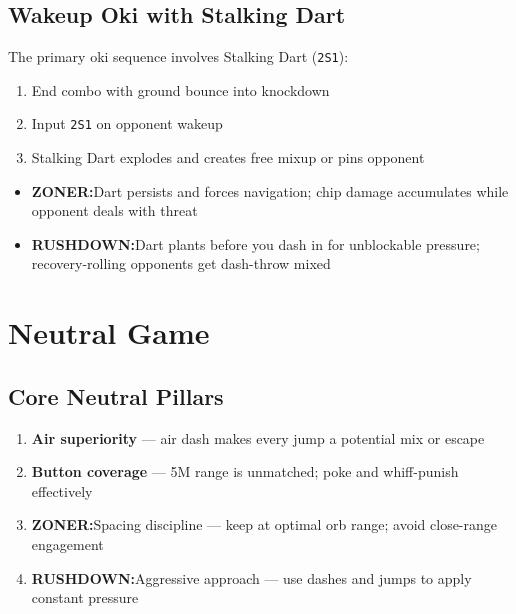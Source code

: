 \documentclass[12pt, a4paper]{report}
\newcommand{\notation}[1]{{\small\texttt{\textcolor{ahriCyan}{#1}}}}
\newcommand{\zoner}{\textcolor{ahriCyan}{\bfseries\sffamily{\small $\blacktriangleright$} ZONER:}\;}
\newcommand{\rushdown}{\textcolor{ahriMagenta}{\bfseries\sffamily{\small $\blacktriangleright$} RUSHDOWN:}\;}
\begin{document}
\section{Wakeup Oki with Stalking Dart}

The primary oki sequence involves Stalking Dart (\notation{2S1}):

\begin{enumerate}
  \item End combo with ground bounce into knockdown
  \item Input \notation{2S1} on opponent wakeup
  \item Stalking Dart explodes and creates free mixup or pins opponent
\end{enumerate}

\begin{itemize}
  \item \zoner Dart persists and forces navigation; chip damage accumulates while opponent deals with threat
  \item \rushdown Dart plants before you dash in for unblockable pressure; recovery-rolling opponents get dash-throw mixed
\end{itemize}

\clearpage

\chapter{Neutral Game}

\section{Core Neutral Pillars}

\begin{enumerate}
  \item \textbf{Air superiority} --- air dash makes every jump a potential mix or escape
  \item \textbf{Button coverage} --- 5M range is unmatched; poke and whiff-punish effectively
  \item \zoner Spacing discipline --- keep at optimal orb range; avoid close-range engagement
  \item \rushdown Aggressive approach --- use dashes and jumps to apply constant pressure
\end{enumerate}
\end{document}

